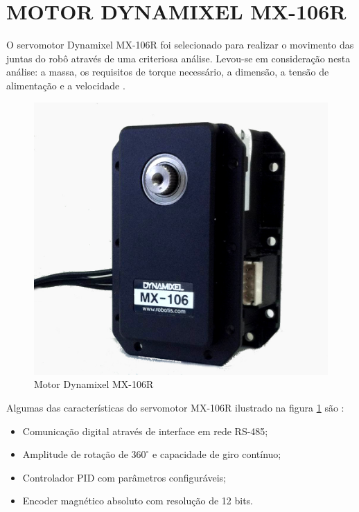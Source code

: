 \documentclass[12pt,oneside,a4paper, chapter=TITLE, section = TITLE, english, brazil]{abntex2}
\begin{document}
\section{MOTOR DYNAMIXEL MX-106R} \label{sec:mot_dyn}

O servomotor Dynamixel MX-106R foi selecionado para realizar o movimento das juntas do robô através de uma criteriosa análise. Levou-se em consideração nesta análise: a massa, os requisitos de torque necessário, a dimensão, a tensão de alimentação e a velocidade \cite{cemig}.

\begin{figure}[h] %
\centering
\includegraphics[scale=0.32]{./imagens/MX-106R}
\caption[Motor Dynamixel MX-106R]{Motor Dynamixel MX-106R}
\label{fig:mx-106r}
\end{figure}

Algumas das características do servomotor MX-106R ilustrado na figura \ref{fig:mx-106r} são \cite{cemig}:

\begin{itemize}

\item Comunicação digital através de interface em rede RS-485;

\item Amplitude de rotação de $360^\circ$ e capacidade de giro contínuo;

\item Controlador PID com parâmetros configuráveis;

\item Encoder magnético absoluto com resolução de 12 bits.

\end{itemize}
\end{document}
